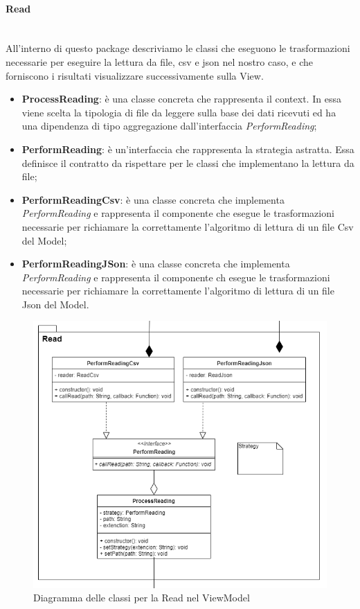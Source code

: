 		\paragraph*{Read} \mbox{} \\[1mm]
		All'interno di questo package descriviamo le classi che eseguono le trasformazioni necessarie per eseguire la lettura da file, csv e json nel nostro caso, e che forniscono i risultati visualizzare successivamente sulla View.
		\begin{itemize}
			\item \textbf{ProcessReading}: è una classe concreta che rappresenta il context. In essa viene scelta la tipologia di file da leggere sulla base dei dati ricevuti ed ha una dipendenza di tipo aggregazione dall'interfaccia \textit{PerformReading};
			\item \textbf{PerformReading}: è un'interfaccia che rappresenta la strategia astratta. Essa definisce il contratto da rispettare per le classi che implementano la lettura da file;
			\item \textbf{PerformReadingCsv}: è una classe concreta che implementa \textit{PerformReading} e rappresenta il componente che esegue le trasformazioni necessarie per richiamare la correttamente l'algoritmo di lettura di un file Csv del Model;
			\item \textbf{PerformReadingJSon}: è una classe concreta che implementa \textit{PerformReading} e rappresenta il componente ch esegue le trasformazioni necessarie per richiamare la correttamente l'algoritmo di lettura di un file Json del Model.
		\end{itemize}
		\mbox{}
				\begin{figure} [H]
					\includegraphics[width=\linewidth]{img/Diagrammi/ViewModel-read-app.png}
					\caption{Diagramma delle classi per la Read nel ViewModel}
				\end{figure}
